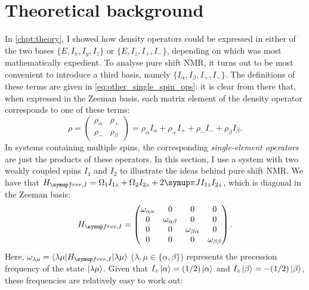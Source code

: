\section{Theoretical background}
\label{sec:pureshift__intro_theory}

In \cref{chpt:theory}, I showed how density operators could be expressed in either of the two bases $\{E, I_x, I_y, I_z\}$ or $\{E, I_z, I_+, I_-\}$, depending on which was most mathematically expedient.
To analyse pure shift NMR, it turns out to be most convenient to introduce a third basis, namely $\{I_\alpha, I_\beta, I_+, I_-\}$\autocite{Keeler2010,Thrippleton2005JMR,Griesinger1986JCP}.
The definitions of these terms are given in \cref{eq:other_single_spin_ops}: it is clear from there that, when expressed in the Zeeman basis, each matrix element of the density operator corresponds to one of these terms:
\begin{equation}
    \label{eq:single_element_operators}
    \rho = \begin{pmatrix}\rho_\alpha & \rho_+ \\ \rho_- & \rho_\beta\end{pmatrix}
     = \rho_\alpha I_\alpha + \rho_+ I_+ + \rho_- I_- + \rho_\beta I_\beta.
\end{equation}
In systems containing multiple spins, the corresponding \textit{single-element operators} are just the products of these operators.
In this section, I use a system with two weakly coupled spins $I_1$ and $I_2$ to illustrate the ideas behind pure shift NMR.
We have that $\HfreeI = \Omega_1 I_{1z} + \Omega_2 I_{2z} + 2\cpi JI_{1z}I_{2z}$, which is diagonal in the Zeeman basis:
\begin{equation}
    \label{eq:h_free_weak}
    \HfreeI = \begin{pmatrix}
        \omega_{\alpha\alpha} & 0 & 0 & 0 \\
        0 & \omega_{\alpha\beta} & 0 & 0 \\
        0 & 0 & \omega_{\beta\alpha} & 0 \\
        0 & 0 & 0 & \omega_{\beta\beta} \\
    \end{pmatrix}.
\end{equation}
Here, $\omega_{\lambda\mu} = \braket{\lambda\mu|\HfreeI|\lambda\mu}$ ($\lambda, \mu \in \{\alpha, \beta\}$) represents the precession frequency of the state $\ket{\lambda\mu}$.
Given that $I_z\ket{\alpha} = (1/2)\ket{\alpha}$ and $I_z\ket{\beta} = -(1/2)\ket{\beta}$, these frequencies are relatively easy to work out:
